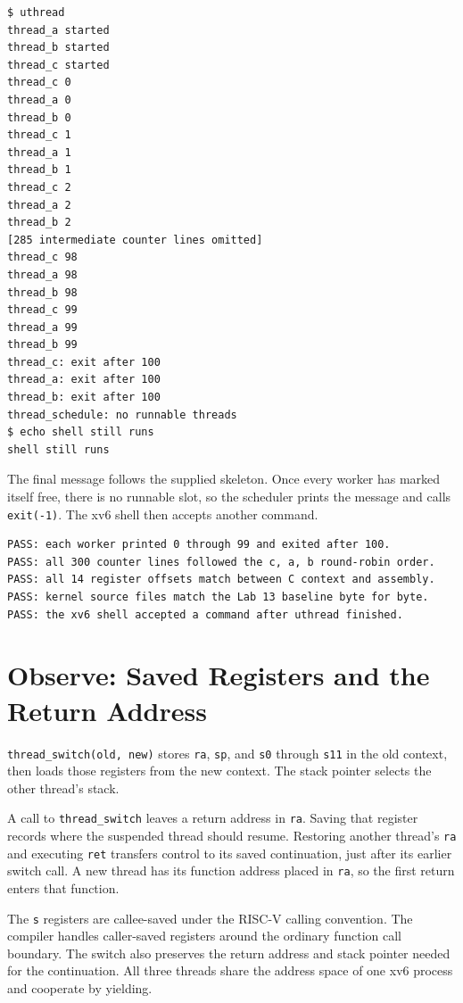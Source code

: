 \documentclass[12pt,a4paper]{article}
\begin{document}
\begin{lstlisting}[caption={Actual xv6 run with the middle counter lines omitted}]
$ uthread
thread_a started
thread_b started
thread_c started
thread_c 0
thread_a 0
thread_b 0
thread_c 1
thread_a 1
thread_b 1
thread_c 2
thread_a 2
thread_b 2
[285 intermediate counter lines omitted]
thread_c 98
thread_a 98
thread_b 98
thread_c 99
thread_a 99
thread_b 99
thread_c: exit after 100
thread_a: exit after 100
thread_b: exit after 100
thread_schedule: no runnable threads
$ echo shell still runs
shell still runs
\end{lstlisting}

The final message follows the supplied skeleton. Once every worker has marked
itself free, there is no runnable slot, so the scheduler prints the message and
calls \texttt{exit(-1)}. The xv6 shell then accepts another command.

\begin{lstlisting}[caption={Checks on the full output, register layout, and source files}]
PASS: each worker printed 0 through 99 and exited after 100.
PASS: all 300 counter lines followed the c, a, b round-robin order.
PASS: all 14 register offsets match between C context and assembly.
PASS: kernel source files match the Lab 13 baseline byte for byte.
PASS: the xv6 shell accepted a command after uthread finished.
\end{lstlisting}

\section{Observe: Saved Registers and the Return Address}
\texttt{thread\_switch(old, new)} stores \texttt{ra}, \texttt{sp}, and
\texttt{s0} through \texttt{s11} in the old context, then loads those registers
from the new context. The stack pointer selects the other thread's stack.

A call to \texttt{thread\_switch} leaves a return address in \texttt{ra}. Saving
that register records where the suspended thread should resume. Restoring
another thread's \texttt{ra} and executing \texttt{ret} transfers control to its
saved continuation, just after its earlier switch call. A new thread has its
function address placed in \texttt{ra}, so the first return enters that function.

The \texttt{s} registers are callee-saved under the RISC-V calling convention.
The compiler handles caller-saved registers around the ordinary function call
boundary. The switch also preserves the return address and stack pointer needed
for the continuation. All three threads share the address space of one xv6
process and cooperate by yielding.
\end{document}
